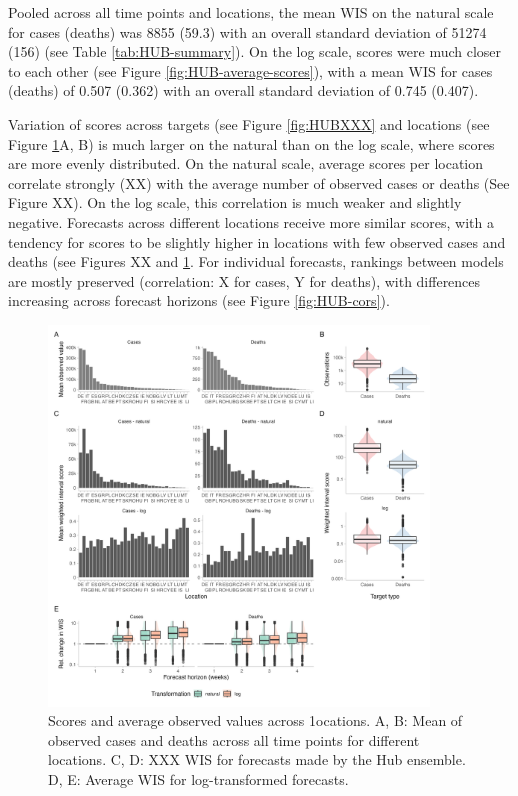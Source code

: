 \documentclass{article}
\begin{document}
Pooled across all time points and locations, the mean WIS on the natural scale for cases (deaths) was 8855 (59.3) with an overall standard deviation of 51274 (156) (see Table \ref{tab:HUB-summary}). On the log scale, scores were much closer to each other (see Figure \ref{fig:HUB-average-scores}), with a mean WIS for cases (deaths) of 0.507 (0.362) with an overall standard deviation of 0.745 (0.407). 

Variation of scores across targets (see Figure \ref{fig:HUBXXX} and locations (see Figure \ref{fig:HUB-mean-locations}A, B) is much larger on the natural than on the log scale, where scores are more evenly distributed. On the natural scale, average scores per location correlate strongly (XX) with the average number of observed cases or deaths (See Figure XX). On the log scale, this correlation is much weaker and slightly negative. Forecasts across different locations receive more similar scores, with a tendency for scores to be slightly higher in locations with few observed cases and deaths (see Figures XX and \ref{fig:HUB-mean-locations}. 
For individual forecasts, rankings between models are mostly preserved (correlation: X for cases, Y for deaths), with differences increasing across forecast horizons (see Figure \ref{fig:HUB-cors}). 

\begin{figure}[h!]
    \centering
    \includegraphics[width=0.9\textwidth]{output/figures/HUB-mean-obs-location.png}
    \caption{Scores and average observed values across 1ocations. A, B: Mean of observed cases and deaths across all time points for different locations. C, D: XXX WIS for forecasts made by the Hub ensemble. D, E: Average WIS for log-transformed forecasts. }
    \label{fig:HUB-mean-locations}
\end{figure}
\end{document}
